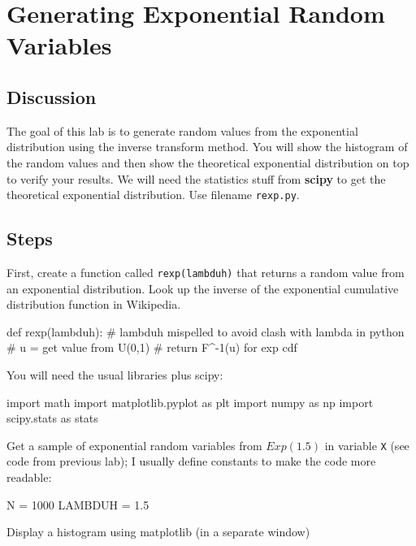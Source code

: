 \chapter{Generating Exponential Random Variables}

\setcounter{problem}{1}
\section{Discussion}

\begin{fullwidth}

The goal of this lab is to generate random values from the exponential distribution using the inverse transform method.  You will show the histogram of the random values and then show the theoretical exponential distribution on top to verify your results. We will need the statistics stuff from {\bf scipy} to get the theoretical exponential distribution. Use filename {\tt rexp.py}.

\section{Steps}

\step First, create a function called {\tt rexp(lambduh)} that returns a random value from an exponential distribution. Look up the inverse of the exponential cumulative distribution function in Wikipedia.

\begin{pyverbatim}
def rexp(lambduh): # lambduh mispelled to avoid clash with lambda in python
    # u = get value from U(0,1)
    # return F^-1(u) for exp cdf
\end{pyverbatim}

\step You will need the usual libraries plus scipy:

\begin{pyverbatim}
import math
import matplotlib.pyplot as plt
import numpy as np
import scipy.stats as stats
\end{pyverbatim}

\step Get a sample of exponential random variables from $Exp(1.5)$ in variable {\tt X} (see code from previous lab); I usually define constants to make the code more readable:

\begin{pyverbatim}
N = 1000
LAMBDUH = 1.5
\end{pyverbatim}

\step Display a histogram using matplotlib (in a separate window)


\end{fullwidth}

